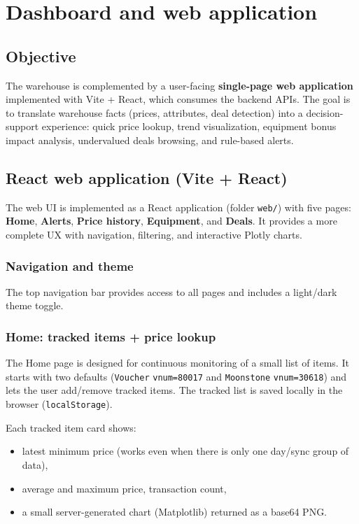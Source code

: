 \chapter{Dashboard and web application}

\section{Objective}
The warehouse is complemented by a user-facing \textbf{single-page web application} implemented with Vite + React, which consumes the backend APIs.
The goal is to translate warehouse facts (prices, attributes, deal detection) into a decision-support experience: quick price lookup, trend visualization, equipment bonus impact analysis, undervalued deals browsing, and rule-based alerts.

\section{React web application (Vite + React)}
The web UI is implemented as a React application (folder \texttt{web/}) with five pages: \textbf{Home}, \textbf{Alerts}, \textbf{Price history}, \textbf{Equipment}, and \textbf{Deals}.
It provides a more complete UX with navigation, filtering, and interactive Plotly charts.

\subsection{Navigation and theme}
The top navigation bar provides access to all pages and includes a light/dark theme toggle.

\subsection{Home: tracked items + price lookup}
The Home page is designed for continuous monitoring of a small list of items.
It starts with two defaults (\texttt{Voucher} \texttt{vnum=80017} and \texttt{Moonstone} \texttt{vnum=30618}) and lets the user add/remove tracked items.
The tracked list is saved locally in the browser (\texttt{localStorage}).

Each tracked item card shows:
\begin{itemize}
  \item latest minimum price (works even when there is only one day/sync group of data),
  \item average and maximum price, transaction count,
  \item a small server-generated chart (Matplotlib) returned as a base64 PNG.
\end{itemize}

